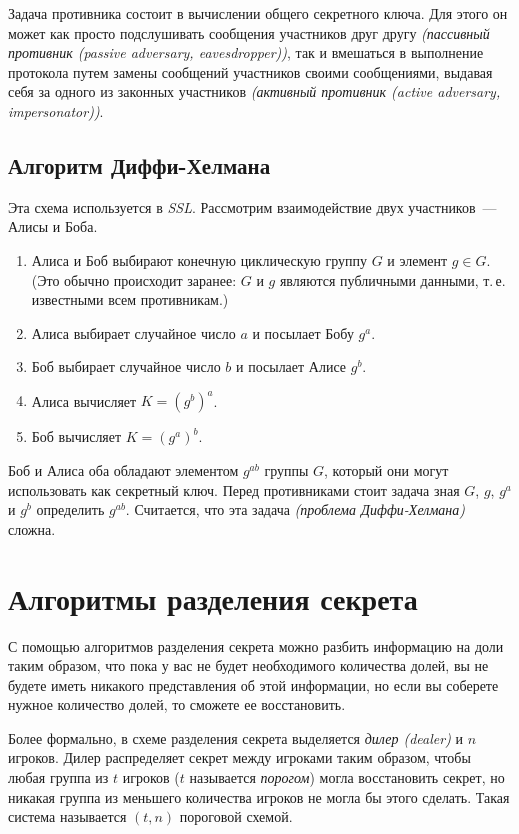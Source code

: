 \documentclass[a4paper,10pt]{article}
\begin{document}
Задача противника состоит в вычислении общего секретного ключа. Для этого он может как просто
подслушивать сообщения участников друг другу {\it (пассивный противник (passive adversary,
eavesdropper))}, так и вмешаться в выполнение протокола путем замены сообщений участников своими
сообщениями, выдавая себя за одного из законных участников {\it (активный противник (active adversary,
impersonator))}. 

\subsection{Алгоритм Диффи-Хелмана}
Эта схема используется в {\it SSL}. Рассмотрим взаимодействие двух участников~--- Алисы и Боба.
\begin{enumerate}
    \item Алиса и Боб выбирают конечную циклическую группу $G$ и элемент $g\in G$.
        (Это обычно происходит заранее: $G$ и $g$ являются публичными данными, т.\,е. известными
        всем противникам.) 
    \item Алиса выбирает случайное число $a$ и посылает Бобу  $g^a$.
    \item Боб   выбирает случайное число $b$ и посылает Алисе $g^b$.
    \item Алиса вычисляет $K = (g^b)^a$.
    \item Боб   вычисляет $K = (g^a)^b$.
\end{enumerate}
Боб и Алиса оба обладают элементом $g^{ab}$ группы $G$, который они могут использовать как секретный
ключ. Перед противниками стоит задача зная $G$, $g$, $g^a$ и $g^b$ определить  $g^{ab}$.
Считается, что эта задача {\it (проблема Диффи-Хелмана)} сложна.

\section{Алгоритмы разделения секрета}
С помощью алгоритмов разделения секрета можно разбить информацию на доли таким образом, что пока у
вас не будет необходимого количества долей, вы не будете иметь никакого представления об этой
информации, но если вы соберете нужное количество долей, то сможете ее восстановить.

Более формально, в схеме разделения секрета выделяется {\it дилер (dealer)} и $n$ игроков.
Дилер распределяет секрет между игроками таким образом, чтобы любая группа из $t$
игроков ($t$ называется {\it порогом}) могла восстановить секрет, но никакая группа из меньшего
количества игроков не могла бы этого сделать. Такая система называется $(t,n)$ пороговой схемой.
\end{document}
